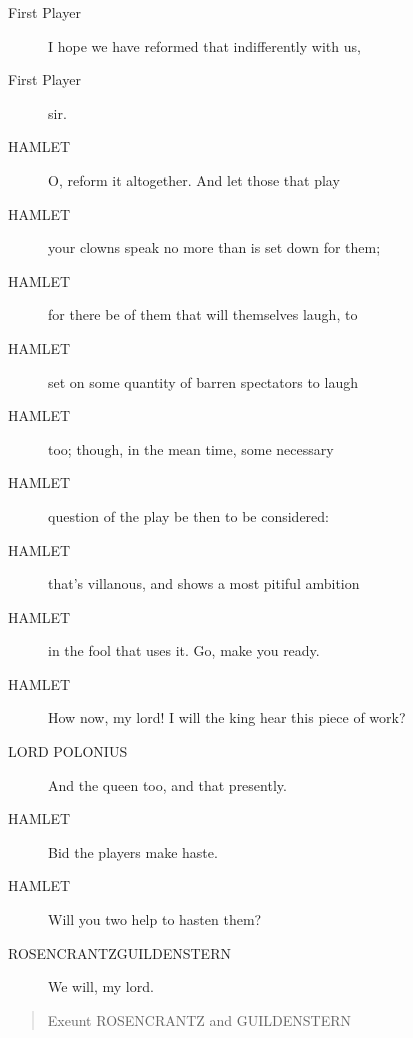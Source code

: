 \documentclass{article}
\begin{document}
\begin{description}
            
\item[First Player] I hope we have reformed that indifferently with us,
\item[First Player] sir.
\end{description}
          
\begin{description}
            
\item[HAMLET] O, reform it altogether. And let those that play
\item[HAMLET] your clowns speak no more than is set down for them;
\item[HAMLET] for there be of them that will themselves laugh, to
\item[HAMLET] set on some quantity of barren spectators to laugh
\item[HAMLET] too; though, in the mean time, some necessary
\item[HAMLET] question of the play be then to be considered:
\item[HAMLET] that's villanous, and shows a most pitiful ambition
\item[HAMLET] in the fool that uses it. Go, make you ready.
\item[HAMLET] How now, my lord! I will the king hear this piece of work?
\end{description}
          
\begin{description}
            
\item[LORD POLONIUS] And the queen too, and that presently.
\end{description}
          
\begin{description}
            
\item[HAMLET] Bid the players make haste.
\item[HAMLET] Will you two help to hasten them?
\end{description}
          
\begin{description}
            
\item[ROSENCRANTZGUILDENSTERN] We will, my lord.
\end{description}
          
\begin{quote}
Exeunt ROSENCRANTZ and GUILDENSTERN
\end{quote}
          
\end{document}
